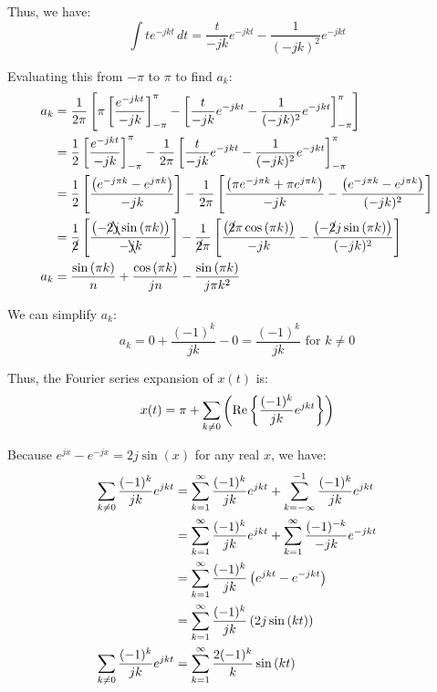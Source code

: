 \documentclass[a4paper, 10pt]{article}
\begin{document}
\begin{tosubmit}
Thus, we have:
\[ \int t e^{-j k t} \,dt = \frac{t}{-j k} e^{-j k t} - \frac{1}{(-j k)^2} e^{-j k t} \]


Evaluating this from \( -\pi \) to \( \pi \) to find \( a_k \):
\begin{align*}
    a_k &= \frac{1}{2\pi} \left[ \pi \left[ \frac{e^{-j k t}}{-j k} \right]_{-\pi}^{\pi} - \left[ \frac{t}{-j k} e^{-j k t} - \frac{1}{(-j k)^2} e^{-j k t} \right]_{-\pi}^{\pi} \right] \\
    &= \frac{1}{2} \left[ \frac{e^{-j k t}}{-j k} \right]_{-\pi}^{\pi} - \frac{1}{2\pi} \left[ \frac{t}{-j k} e^{-j k t} - \frac{1}{(-j k)^2} e^{-j k t} \right]_{-\pi}^{\pi} \\
    &= \frac{1}{2} \left[ \frac{ \left( e^{-j \pi k} - e^{j \pi k} \right) }{-j k} \right] - \frac{1}{2\pi} \left[ \frac{ \left( \pi e^{-j \pi k} + \pi e^{j \pi k} \right) }{-j k} - \frac{ \left( e^{-j \pi k} - e^{j \pi k} \right) }{(-j k)^2} \right] \\
    &= \frac{1}{\cancel{2}} \left[ \frac{ \left( -\cancel{2} \bcancel{j} \sin{(\pi k)} \right) }{- \bcancel{j} k} \right] - \frac{1}{\cancel{2}\pi} \left[ \frac{ \left( \cancel{2}\pi \cos{(\pi k)} \right) }{-j k} - \frac{ \left( -\cancel{2}j\sin{(\pi k)} \right) }{(-j k)^2} \right] \\
    a_k &= \frac{ \sin{(\pi k)} }{n} + \frac{ \cos{(\pi k)} }{jn} - \frac{ \sin{(\pi k)} }{j\pi k^2}
\end{align*}

We can simplify \( a_k \):
\[
a_k = 0 + \frac{ (-1)^k }{jk} - 0 = \frac{ (-1)^k }{jk} \text{ for } k \neq 0
\]

Thus, the Fourier series expansion of \( x(t) \) is:
\[ x(t) = \pi + \sum_{k \neq 0} \left( \text{Re} \left\{ \frac{(-1)^k}{jk} e^{j k t} \right\} \right) \]

Because \( e^{jx} - e^{-jx} = 2j\sin{(x)} \) for any real \( x \), we have:
\begin{align*}
    \sum_{k \neq 0} \frac{(-1)^k}{jk} e^{j k t} &= \sum_{k=1}^{\infty} \frac{(-1)^k}{jk} e^{j k t} + \sum_{k=-\infty}^{-1} \frac{(-1)^k}{jk} e^{j k t} \\
    &= \sum_{k=1}^{\infty} \frac{(-1)^k}{jk} e^{j k t} + \sum_{k=1}^{\infty} \frac{(-1)^{-k}}{-jk} e^{-j k t} \\
    &= \sum_{k=1}^{\infty} \frac{(-1)^k}{jk} \left( e^{j k t} - e^{-j k t} \right) \\
    &= \sum_{k=1}^{\infty} \frac{(-1)^k}{jk} \left( 2j\sin{(k t)} \right) \\
    \sum_{k \neq 0} \frac{(-1)^k}{jk} e^{j k t} &= \sum_{k=1}^{\infty} \frac{2(-1)^k}{k} \sin{(k t)}
\end{align*}


\end{tosubmit}
\end{document}
